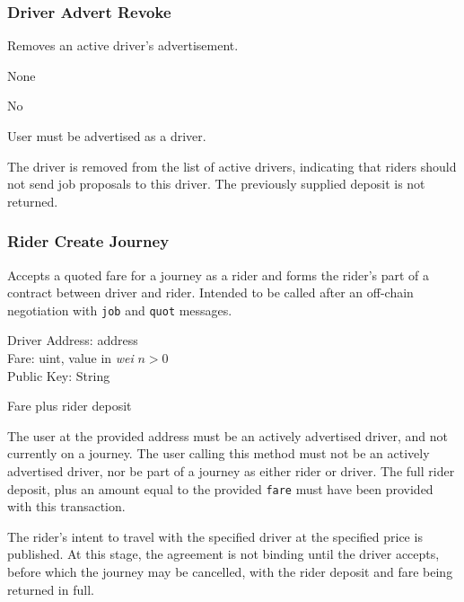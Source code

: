 \subsubsection{Driver Advert Revoke}

\begin{description}[leftmargin=8em,style=nextline]
	\item [Description]
		Removes an active driver's advertisement.
	\item [Arguments]
		None
	\item [Payable]
		No
	\item [Preconditions]
		User must be advertised as a driver.
	\item [Postconditions]
		The driver is removed from the list of active drivers, indicating that riders should not send job proposals to this driver. The previously supplied deposit is not returned.
\end{description}

\subsubsection{Rider Create Journey}

\begin{description}[leftmargin=8em,style=nextline]
	\item [Description]
		Accepts a quoted fare for a journey as a rider and forms the rider's part of a contract between driver and rider. Intended to be called after an off-chain negotiation with \lstinline{job} and \lstinline{quot} messages.
	\item [Arguments]
		Driver Address: address \\
		Fare: uint, value in \textit{wei} $n > 0$ \\
		Public Key: String
	\item [Payable]
		Fare plus rider deposit
	\item [Preconditions]
		The user at the provided address must be an actively advertised driver, and not currently on a journey. The user calling this method must not be an actively advertised driver, nor be part of a journey as either rider or driver. The full rider deposit, plus an amount equal to the provided \lstinline{fare} must have been provided with this transaction.
	\item [Postconditions]
		The rider's intent to travel with the specified driver at the specified price is published. At this stage, the agreement is not binding until the driver accepts, before which the journey may be cancelled, with the rider deposit and fare being returned in full.
\end{description}

